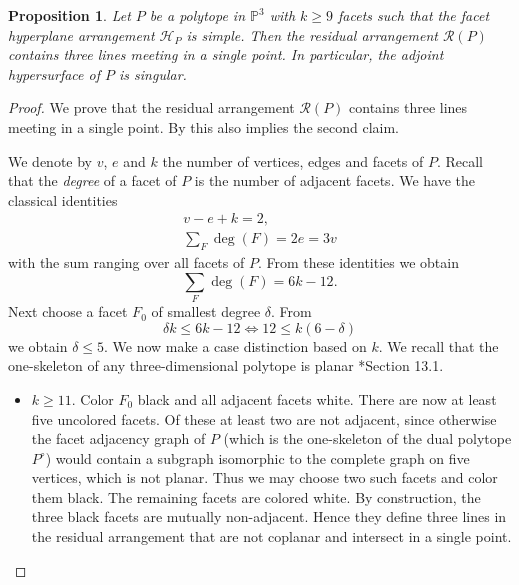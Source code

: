 \documentclass[a4paper,10pt]{amsart}
\theoremstyle{definition}
\theoremstyle{plain}
\newtheorem{prop}[Def]{Proposition}
\newcommand{\cR}{{\mathcal R}}
\newcommand{\pp}{\mathbb{P}}
\begin{document}
\begin{prop}\label{prop:adj_sing}
 Let $P$ be a polytope in $\pp^3$ with $k\geq9$ facets such that the facet hyperplane arrangement $\mathcal{H}_P$ is simple. Then the residual arrangement $\cR(P)$ contains three lines meeting in a single point.
 In particular, the adjoint hypersurface of $P$ is singular.
\end{prop}

\begin{proof}
 We prove that the residual arrangement $\cR(P)$ contains three lines meeting in a single point. By  this also implies the second claim.

 We denote by $v$, $e$ and $k$ the number of vertices, edges and facets of $P$. Recall that the \emph{degree} of a facet of $P$ is the number of adjacent facets. We have the classical identities
 \begin{equation*}
 \begin{split}
    v - e + k = 2, \\
    \sum_F \deg(F) = 2e = 3v
 \end{split}
 \end{equation*}
 with the sum ranging over all facets of $P$. From these identities we obtain
 \begin{equation*}
     \sum_F \deg(F) = 6k - 12.
 \end{equation*}
 Next choose a facet $F_0$ of smallest degree $\delta$. From
 \begin{equation*}
    \delta k \leq 6k-12 \iff 12 \leq k(6-\delta)
 \end{equation*}
 we obtain $\delta \leq 5$. 
 We now make a case distinction based on $k$. We recall that the one-skeleton of any three-dimensional polytope is planar \cite{grunbaum1967convex}*{Section 13.1}.
 \begin{itemize}
     \item $k \geq 11$. Color $F_0$ black and all adjacent facets white. There are now at least five uncolored facets. Of these at least two are not adjacent, since otherwise the facet adjacency graph of $P$ (which is the one-skeleton of the dual polytope $P^\circ$) would contain a subgraph isomorphic to the complete graph on five vertices, which is not planar. Thus we may choose two such facets and color them black. The remaining facets are colored white. By construction, the three black facets are mutually non-adjacent. Hence they define three lines in the residual arrangement that are not coplanar and intersect in a single point.


\end{itemize}
\end{proof}
\end{document}

